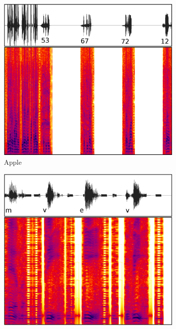 \begin{figure}[tp]
\begin{subfigure}{0.3\textwidth}
        \includegraphics[width=\textwidth]{figures/apple.pdf}
        \caption{Apple}
        \label{fig:apple}
\end{subfigure} \hspace{0.03\textwidth}
\begin{subfigure}{0.3\textwidth}
        \includegraphics[width=\textwidth]{figures/botdetect.pdf}

\end{subfigure}
\end{figure}
